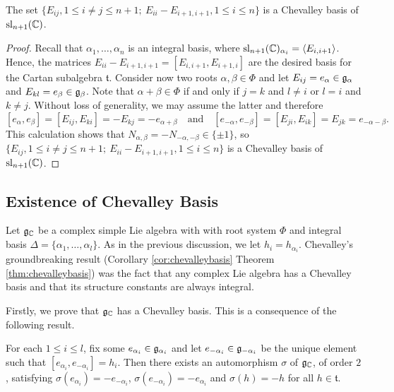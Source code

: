 \begin{proposition}
    The set $\{E_{ij}, 1\leq i\neq j\leq n+1;\ E_{ii}-E_{i+1,i+1}, 1\leq i\leq n\}$ is a Chevalley basis of $\mathrm{sl}_{n+1}(\mathbb{C})$.
\end{proposition}
\begin{proof}
    Recall that $\alpha_1,\ldots,\alpha_n$ is an integral basis, where $\mathrm{sl}_{n+1}(\mathbb{C})_{\alpha_i}=\langle E_{i,i+1}\rangle$. Hence, the matrices $E_{ii}-E_{i+1,i+1}=[E_{i,i+1},E_{i+1,i}]$ are the desired basis for the Cartan subalgebra $\mathfrak{t}$. Consider now two roots $\alpha,\beta\in\Phi$ and let $E_{ij}=e_\alpha\in\mathfrak{g}_\alpha$ and $E_{kl}=e_\beta\in\mathfrak{g}_\beta$. Note that $\alpha+\beta\in\Phi$ if and only if $j=k$ and $l\neq i$ or $l=i$ and $k\neq j$. Without loss of generality, we may assume the latter and therefore
    $$[e_\alpha,e_\beta]=[E_{ij},E_{ki}]=-E_{kj}=-e_{\alpha+\beta}\quad\text{and}\quad[e_{-\alpha},e_{-\beta}]=[E_{ji},E_{ik}]=E_{jk}=e_{-\alpha-\beta}.$$
    This calculation shows that $N_{\alpha,\beta}=-N_{-\alpha,-\beta}\in\{\pm1\}$, so $\{E_{ij}, 1\leq i\neq j\leq n+1;\ E_{ii}-E_{i+1,i+1}, 1\leq i\leq n\}$ is a Chevalley basis of $\mathrm{sl}_{n+1}(\mathbb{C})$.
\end{proof}

\subsection{Existence of Chevalley Basis}
Let $\mathfrak{g}_{\mathbb{C}}$ be a complex simple Lie algebra with with root system $\Phi$ and integral basis $\Delta=\{\alpha_1,\ldots,\alpha_l\}$. As in the previous discussion, we let $h_i=h_{\alpha_i}$. Chevalley's groundbreaking result (Corollary \ref{cor:chevalleybasis}  Theorem \ref{thm:chevalleybasis}) was the fact that any complex Lie algebra has a Chevalley basis and that its structure constants are always integral. 

Firstly, we prove that $\mathfrak{g}_{\mathbb{C}}$ has a Chevalley basis. This is a consequence of the following result.

\begin{proposition}
    For each $1\leq i\leq l$, fix some $e_{\alpha_i}\in\mathfrak{g}_{\alpha_i}$ and let $e_{-\alpha_i}\in\mathfrak{g}_{-\alpha_i}$ be the unique element such that $[e_{\alpha_i},e_{-\alpha_i}]=h_i$. Then there exists an automorphism $\sigma$ of $\mathfrak{g}_{\mathbb{C}}$, of order $2$, satisfying $\sigma(e_{\alpha_i})=-e_{-\alpha_i}$, $\sigma(e_{-\alpha_i})=-e_{\alpha_i}$ and $\sigma(h)=-h$ for all $h\in\mathfrak{t}$.
\end{proposition}

